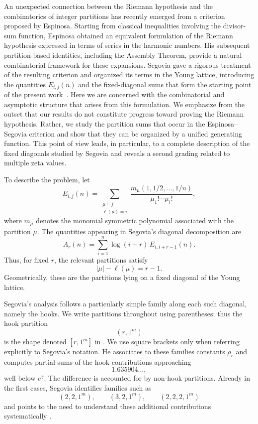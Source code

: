 \documentclass[11pt]{article}
\theoremstyle{definition}
\begin{document}
An unexpected connection between the Riemann hypothesis and the
combinatorics of integer partitions has recently emerged from a
criterion proposed by Espinosa.  Starting from classical inequalities
involving the divisor-sum function, Espinosa obtained an equivalent
formulation of the Riemann hypothesis expressed in terms of series
in the harmonic numbers.  His subsequent partition-based identities,
including the Assembly Theorem, provide a natural combinatorial
framework for these expansions.
Segovia gave a rigorous treatment of the resulting criterion and
organized its terms in the Young lattice, introducing the quantities
$E_{i,j}(n)$ and the fixed-diagonal sums that form the starting point
of the present work~\cite{Segovia2026}.
Here we are concerned with the combinatorial and asymptotic
structure that arises from this formulation.  We emphasize from the
outset that our results do not constitute progress toward proving the
Riemann hypothesis.  Rather, we study the partition sums that occur in
the Espinosa--Segovia criterion and show that they can be organized by
a unified generating function.  This point of view leads, in
particular, to a complete description of the fixed diagonals studied
by Segovia and reveals a second grading related to multiple zeta
values.

To describe the problem, let
\[
 E_{i,j}(n)
 =
 \sum_{\substack{\mu\vdash j\\ \ell(\mu)=i}}
 \frac{
 m_\mu(1,1/2,\ldots,1/n)
 }{\mu_1!\cdots\mu_i!},
\]
where $m_\mu$ denotes the monomial symmetric polynomial associated
with the partition $\mu$.  The quantities appearing in Segovia's
diagonal decomposition are
\[
 A_r(n)
 =
 \sum_{i=1}^{n}
 \log(i+r)\,E_{i,i+r-1}(n).
\]
Thus, for fixed $r$, the relevant partitions satisfy
\[
        |\mu|-\ell(\mu)=r-1.
\]
Geometrically, these are the partitions lying on a fixed diagonal of
the Young lattice.

Segovia's analysis follows a particularly simple family along each
such diagonal, namely the hooks.  We write partitions throughout
using parentheses; thus the hook partition
\[
        (r,1^m)
\]
is the shape denoted $[r,1^m]$ in \cite{Segovia2026}.  We use
square brackets only when referring explicitly to Segovia's notation.
He associates to these families constants $\rho_r$ and computes
partial sums of the hook contributions approaching
\[
        1.635904\ldots,
\]
well below $e^\gamma$.  The difference is
accounted for by non-hook partitions.  Already in the first cases,
Segovia identifies families such as
\[
(2,2,1^m),\qquad
(3,2,1^m),\qquad
(2,2,2,1^m)
\]
and points to the need to understand these additional contributions
systematically \cite{Segovia2026}.
\end{document}
